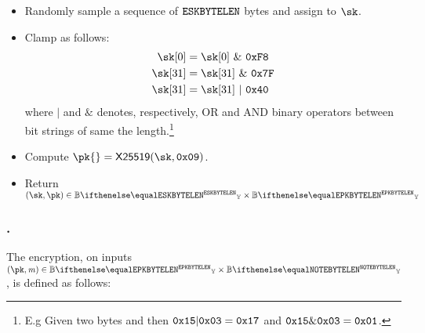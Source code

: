 \begin{itemize}
    \item Randomly sample a sequence of $\mathtt{ESKBYTELEN}$ bytes and assign to $\sk$.
    \item Clamp \sk{} as follows:
    \begin{align*}
        \sk[0] &= \sk[0]\ \&\ \bytestyle{F8}\\
        \sk[31] &= \sk[31]\ \&\ \bytestyle{7F}\\
        \sk[31] &= \sk[31]\ |\ \bytestyle{40}
    \end{align*}
    where $|$ and $\&$ denotes, respectively, OR and AND binary operators between bit strings of same the length.\footnote{E.g Given two bytes  and  then $\texttt{0x15} | \texttt{0x03} = \texttt{0x17}$ and $\texttt{0x15} \& \texttt{0x03} = \texttt{0x01}$.}
    \item Compute $\pk{} = \xscalarmult{25519}(\sk, \bytestyle{09})$.
    \item Return $(\sk, \pk) \in \BBy{\eskByteLen} \times \BBy{\epkByteLen}$
\end{itemize}

\subsubsection{\encscheme.\enc}

The encryption, on inputs $(\pk, \msg) \in \BBy{\epkByteLen} \times \BBy{\noteByteLen}$, is defined as follows:

